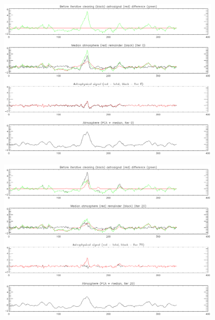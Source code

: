 \documentclass[12pt,preprint]{aastex}
\begin{document}
  
\begin{figure}
  \begin{minipage}{6.5in}
    \begin{center}
      \includegraphics[scale=0.9]{iterative_mapping2}
      \caption{}
    \end{center}
    \label{fig:IterativeMapping-b}
  \end{minipage}
\end{figure}

\addtocounter{figure}{-1}
\addtocounter{subfig}{1}

\begin{figure}
  \begin{minipage}{6.5in}
    \begin{center}
      \includegraphics[scale=0.9]{iterative_mapping3}
      \caption{}
    \end{center}
    \label{fig:IterativeMapping-c}
  \end{minipage}
\end{figure}
\end{document}
